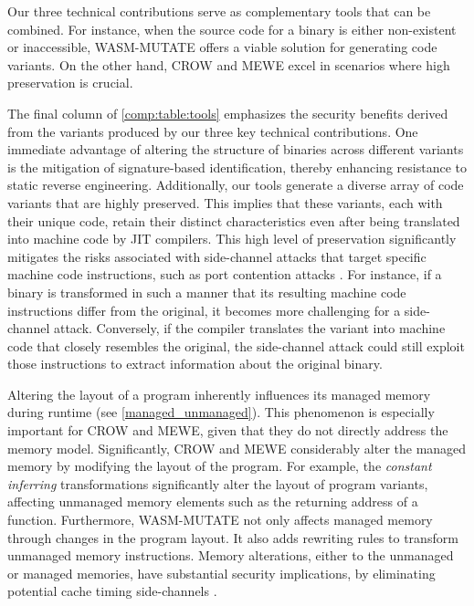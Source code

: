 \begin{tcolorbox}[title=Takeaway,boxrule=1pt,arc=.2em,boxsep=1.0mm]
    
    Our three technical contributions serve as complementary tools that can be combined.
    For instance, when the source code for a \Wasm binary is either non-existent or inaccessible, WASM-MUTATE offers a viable solution for generating code variants. 
    On the other hand, CROW and MEWE excel in scenarios where high preservation is crucial.
\end{tcolorbox}


\label{security_applications}

The final column of \autoref{comp:table:tools} emphasizes the security benefits derived from the variants produced by our three key technical contributions. 
One immediate advantage of altering the structure of \Wasm binaries across different variants is the mitigation of signature-based identification, thereby enhancing resistance to static reverse engineering.
Additionally, our tools generate a diverse array of code variants that are highly preserved. 
This implies that these variants, each with their unique \Wasm code, retain their distinct characteristics even after being translated into machine code by JIT compilers. 
This high level of preservation significantly mitigates the risks associated with side-channel attacks that target specific machine code instructions, such as port contention attacks \cite{10.1145/3488932.3517411}.
For instance, if a \Wasm binary is transformed in such a manner that its resulting machine code instructions differ from the original, it becomes more challenging for a side-channel attack. 
Conversely, if the compiler translates the variant into machine code that closely resembles the original, the side-channel attack could still exploit those instructions to extract information about the original \Wasm binary.

Altering the layout of a \Wasm program inherently influences its managed memory during runtime (see \autoref{managed_unmanaged}).
This phenomenon is especially important for CROW and MEWE, given that they do not directly address the \Wasm memory model.
Significantly, CROW and MEWE considerably alter the managed memory by modifying the layout of the \Wasm program.
For example, the \emph{constant inferring} transformations significantly alter the layout of program variants, affecting unmanaged memory elements such as the returning address of a function.
Furthermore, WASM-MUTATE not only affects managed memory through changes in the \Wasm program layout.
It also adds rewriting rules to transform unmanaged memory instructions.
Memory alterations, either to the unmanaged or managed memories, have substantial security implications, by eliminating potential cache timing side-channels \cite{Swivel}.


